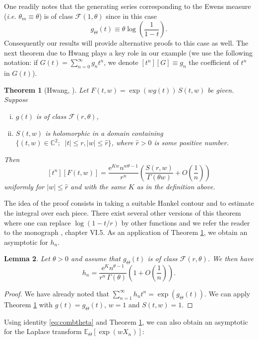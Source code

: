 \documentclass[12pt,a4paper,reqno]{amsart}
\newtheorem{lemma}{Lemma}[section]
\newtheorem{theorem}[lemma]{Theorem}
\theoremstyle{remark}
\newcommand{\E}{\mathrm{e}}
\newcommand{\esper}{\mathbb{E}}
\begin{document}
One readily notes that the generating series corresponding to the Ewens measure (\emph{i.e.} $\theta_m\equiv\theta$) is of class $\mathcal F(1,\theta)$ since in this case
$$g_\Theta(t)\equiv \theta\log\left(\dfrac{1}{1-t}\right).$$ Consequently our results will provide alternative proofs to this case as well.
The next theorem due to Hwang plays a key role in our example (we use the following notation: if $G(t)=\sum_{n=0}^\infty g_n t^n$,  we denote $[t^n][G]\equiv g_n$ the coefficient of $t^n$ in $G(t)$).
\begin{theorem}[Hwang, \cite{Hwa94}] \label{thm:hwang94}
Let $F(t,w)=\exp(w g(t))\,S(t,w)$ be given. Suppose\vspace{2mm}
\begin{enumerate}[(i)]
\item $g(t)$ is of class $\mathcal F(r,\theta)$,\vspace{2mm}
\item $S(t,w)$ is holomorphic in a domain containing $\{(t,w)\in\mathbb C^2;\;\; |t|\leq r, |w|\leq \hat r\}$, where $\hat r>0$ is some positive number.\vspace{2mm}
\end{enumerate}
Then 
$$[t^n][F(t,w)]=\dfrac{\E^{Kw}n^{w\theta-1}}{r^n}\left(\dfrac{S(r,w)}{\Gamma(\theta w)}+O\!\left(\dfrac{1}{n}\right)\right)$$
uniformly for $|w|\leq\hat r$ and with the same $K$ as in the definition above.
\end{theorem}
The idea of the proof consists in taking a suitable Hankel contour and to estimate the integral over each piece.  There exist several other versions of this theorem where one can replace $\log (1-t/r)$ by other functions and we refer the reader to the monograph \cite{FSe09}, chapter VI.5. As an application of Theorem \ref{thm:hwang94}, we obtain an asymptotic for $h_n$.

\begin{lemma}\label{lem:hn}
Let $\theta>0$ and assume that $g_\Theta(t)$ is of class $\mathcal F(r,\theta)$. We then have
$$h_n=\dfrac{\E^{K}n^{\theta-1}}{r^n\,\Gamma(\theta)}\left(1+O\!\left(\dfrac{1}{n}\right)\right).$$
\end{lemma}

\begin{proof}
We have already noted that $\sum_{n=1}^\infty h_n t^n=\exp(g_\Theta(t))$. We can apply Theorem \ref{thm:hwang94} with $g(t)=g_\Theta(t)$, $w=1$ and $S(t,w)=1$.
\end{proof}
\bigskip


Using identity \eqref{eq:combtheta} and Theorem \ref{thm:hwang94}, we can also obtain an asymptotic for the Laplace transform $\esper_{\Theta} [\exp(w X_n)]$:
\end{document}
